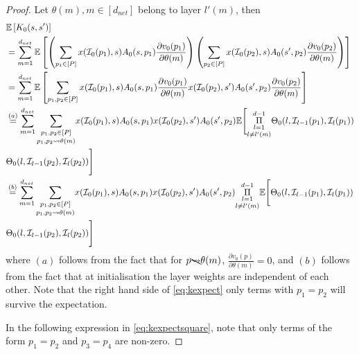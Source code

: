 \begin{appendix}
\begin{proof}
 Let $\theta(m),m\in[d_{net}]$ belong to layer $l'(m)$, then 
\begin{align}\label{eq:kexpect} 
&\mathbb{E}\left[K_0(s,s')\right]\nonumber\\
&=\sum_{m=1}^{d_{net}}\mathbb{E}\left[\left(\sum_{p_1 \in[P]}x(\mathcal{I}_0(p_1),s)A_0(s,p_1)\frac{\partial v_0(p_1)}{\partial \theta(m)}\right)\left(\sum_{p_2\in[P]}x(\mathcal{I}_0(p_2),s)A_0(s',p_2)\frac{\partial v_0(p_2)}{\partial \theta(m)}\right)\right]\nonumber\\
&=\sum_{m=1}^{d_{net}}\mathbb{E}\left[\sum_{p_1,p_2\in[P]}x(\mathcal{I}_0(p_1),s)A_0(s,p_1)\frac{\partial v_0(p_1)}{\partial \theta(m)}x(\mathcal{I}_0(p_2),s')A_0(s',p_2)\frac{\partial v_0(p_2)}{\partial \theta(m)}\right]\nonumber\\
&\stackrel{(a)}=\sum_{m=1}^{d_{net}}\underset{p_1,p_2\rightsquigarrow\theta(m)}{\sum_{p_1,p_2\in[P]}}x(\mathcal{I}_0(p_1),s)A_0(s,p_1)x(\mathcal{I}_0(p_2),s')A_0(s',p_2) \mathbb{E}\Bigg[\underset{l\neq l'(m)}{\underset{l=1}{\overset{d-1}{\Pi}}} {\Theta}_0(l,\mathcal{I}_{l-1}(p_1),\mathcal{I}_{l}(p_1)) \nonumber\\&{\Theta}_0(l,\mathcal{I}_{l-1}(p_2),\mathcal{I}_{l}(p_2))\Bigg]\nonumber\\
&\stackrel{(b)}=\sum_{m=1}^{d_{net}}\underset{p_1,p_2\rightsquigarrow\theta(m)}{\sum_{p_1,p_2\in[P]}}x(\mathcal{I}_0(p_1),s)A_0(s,p_1)x(\mathcal{I}_0(p_2),s')A_0(s',p_2) \underset{l\neq l'(m)}{\underset{l=1}{\overset{d-1}{\Pi}}} \mathbb{E}\Bigg[ {\Theta}_0(l,\mathcal{I}_{l-1}(p_1),\mathcal{I}_{l}(p_1))\nonumber\\
& {\Theta}_0(l,\mathcal{I}_{l-1}(p_2),\mathcal{I}_{l}(p_2))\Bigg]
\end{align}
where $(a)$ follows from the fact that for $p\bcancel{\rightsquigarrow}\theta(m)$, $\frac{\partial v_0(p)}{\partial \theta(m)}=0$, and $(b)$ follows from the fact that at initialisation the layer weights are independent of each other. Note that the right hand side of \eqref{eq:kexpect} only terms with $p_1=p_2$ will survive the expectation.

In the following expression in \eqref{eq:kexpectsquare}, note that only terms of the form $p_1=p_2$ and $p_3=p_4$ are non-zero.


\end{proof}
\end{appendix}
